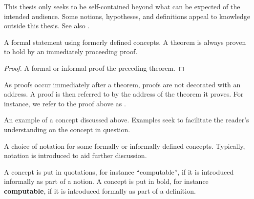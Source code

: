This thesis only seeks to be self-contained beyond what can be expected of the
intended audience. Some notions, hypotheses, and definitions appeal to
knowledge outside this thesis. See also .

\begin{theorem} \label{thm:theorem} A formal statement using formerly
defined concepts. A theorem is always proven to hold by an immediately
proceeding proof.\end{theorem}

\begin{proof} A formal or informal proof the preceding theorem. \end{proof}

As proofs occur immediately after a theorem, proofs are not decorated with an
address. A proof is then referred to by the address of the theorem it proves.
For instance, we refer to the proof above as .

\begin{example} An example of a concept discussed above. Examples seek to
facilitate the reader's understanding on the concept in question.
\end{example}

\begin{notation}

A choice of notation for some formally or informally defined concepts.
Typically, notation is introduced to aid further discussion.

\end{notation}

A concept is put in quotations, for instance ``computable'', if it is
introduced informally as part of a notion. A concept is put in bold, for
instance \textbf{computable}, if it is introduced formally as part of a
definition.


